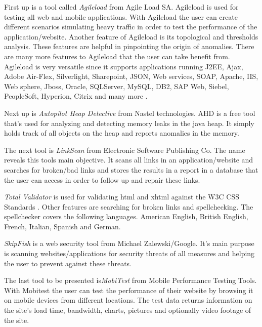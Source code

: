 \documentclass[a4paper]{article}
\begin{document}
First up is a tool called \emph {Agileload} from Agile Load SA. Agileload is used for testing all web and mobile applications.
With Agileload the user can create different scenarios simulating heavy traffic in order to test the performance of the
application/website. Another feature of Agileload is its topological and thresholds analysis. These features are helpful 
in pinpointing the origin of anomalies. There are many more features to Agileload that the user can take benefit from.
Agileload is very versatile since
it supports
applications
running J2EE,
Ajax, Adobe Air-Flex, Silverlight, Sharepoint, JSON, 
Web services, SOAP, Apache, IIS, Web sphere, Jboss, Oracle, SQLServer, MySQL, DB2, SAP Web, Siebel, PeopleSoft, Hyperion, 
Citrix and
many more \cite{agileload}.
 
Next up is \emph{Autopilot Heap Detective} from Nastel technologies.
AHD is a free tool that's used for analyzing and detecting 
memory leaks in the java heap. It simply holds track of all objects on the heap and reports anomalies in the memory. \cite{ahd}
 
The next tool is \emph{LinkScan} from Electronic Software Publishing Co. The name reveals this tools main objective. It scans all 
links in an application/website and searches for broken/bad links and stores the results in a report in a database that the 
user can access in order to follow up and repair these links. \cite{links} 
 
\emph {Total Validator} is used for validating html and xhtml against the W3C CSS Standards \cite{w3}. Other features are searching 
for broken links and spellchecking. The spellchecker covers the following languages. American English, British English,
French, Italian, Spanish and German.\cite{totval} 

\emph {SkipFish} is a web security tool from Michael Zalewski/Google. It's main purpose is scanning websites/applications for 
security threats of all measures and helping the user to prevent against these threats. \cite{skipfish}
 
The last tool to be presented is\emph {MobiTest} from Mobile Performance Testing Tools.  With Mobitest the user can test the 
performance of their website by browsing it on mobile devices from different locations. The test data returns information 
on the site’s load time, bandwidth, charts, pictures and optionally video footage of the site. \cite{mobitest} 
 
\end{document}
